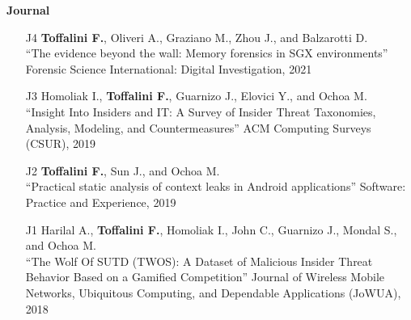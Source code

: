 \textbf{Journal}\begin{enumerate}[leftmargin=5mm]
\item[J4] \textbf{Toffalini F.}, Oliveri A., Graziano M., Zhou J., and Balzarotti D.\\``The evidence beyond the wall: Memory forensics in SGX environments'' Forensic Science International: Digital Investigation, 2021 
\item[J3] Homoliak I., \textbf{Toffalini F.}, Guarnizo J., Elovici Y., and Ochoa M.\\``Insight Into Insiders and IT: A Survey of Insider Threat Taxonomies, Analysis, Modeling, and Countermeasures'' ACM Computing Surveys (CSUR), 2019 
\item[J2] \textbf{Toffalini F.}, Sun J., and Ochoa M.\\``Practical static analysis of context leaks in Android applications'' Software: Practice and Experience, 2019 
\item[J1] Harilal A., \textbf{Toffalini F.}, Homoliak I., John C., Guarnizo J., Mondal S., and Ochoa M.\\``The Wolf Of SUTD (TWOS): A Dataset of Malicious Insider Threat Behavior Based on a Gamified Competition'' Journal of Wireless Mobile Networks, Ubiquitous Computing, and Dependable Applications (JoWUA), 2018 
\end{enumerate}
